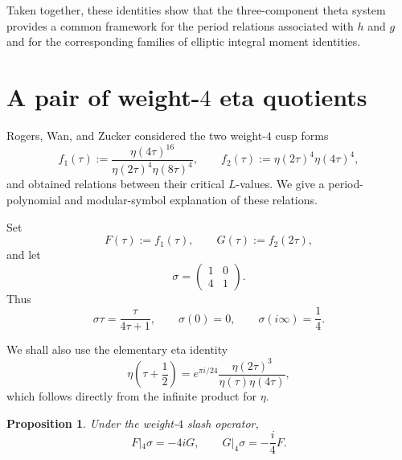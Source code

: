\documentclass[preprint,12pt]{elsarticle}
\newtheorem{proposition}[theorem]{Proposition}
\theoremstyle{definition}
\theoremstyle{remark}
\begin{document}
Taken together, these identities show that the three-component theta system provides a common framework for the period relations associated with $h$ and $g$ and for the corresponding families of elliptic integral moment identities.


\section{A pair of weight-$4$ eta quotients}\label{weight-4}
	
	Rogers, Wan, and Zucker \cite{MR3338042} considered the two weight-$4$ cusp forms
	\[
	f_1(\tau):=\frac{\eta(4\tau)^{16}}{\eta(2\tau)^4\eta(8\tau)^4},
	\qquad
	f_2(\tau):=\eta(2\tau)^4\eta(4\tau)^4,
	\]
	and obtained relations between their critical $L$-values.  We give a period-polynomial and modular-symbol explanation of these relations.
	
	Set
	\[
	F(\tau):=f_1(\tau),\qquad G(\tau):=f_2(2\tau),
	\]
	and let
	\[
	\sigma=
	\begin{pmatrix}
		1&0\\
		4&1
	\end{pmatrix}.
	\]
	Thus
	\[
	\sigma\tau=\frac{\tau}{4\tau+1},
	\qquad
	\sigma(0)=0,\qquad
	\sigma(i\infty)=\frac14.
	\]
	
	We shall also use the elementary eta identity
	\[
	\eta\left(\tau+\frac12\right)
	=
	e^{\pi i/24}\frac{\eta(2\tau)^3}{\eta(\tau)\eta(4\tau)},
	\]
	which follows directly from the infinite product for $\eta$.
	
	\begin{proposition}
		Under the weight-$4$ slash operator,
		\[
		F|_4\sigma=-4iG,
		\qquad
		G|_4\sigma=-\frac{i}{4}F.
		\]
	\end{proposition}
	
\end{document}
